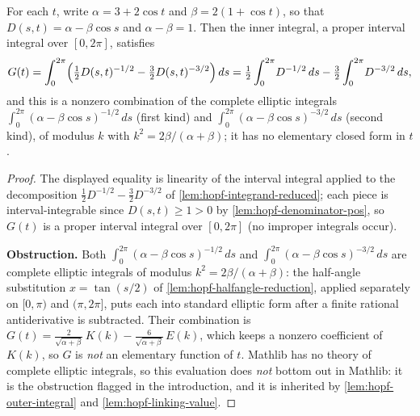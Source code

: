 \begin{lemma}
    \label{lem:hopf-inner-integral}
    For each $t$, write $\alpha=3+2\cos t$ and $\beta=2(1+\cos t)$, so that
    $D(s,t)=\alpha-\beta\cos s$ and $\alpha-\beta=1$. Then the inner integral, a
    proper interval integral over $[0,2\pi]$, satisfies
    \[
        G(t)=\int_0^{2\pi}\Bigl(\tfrac12 D(s,t)^{-1/2}-\tfrac32 D(s,t)^{-3/2}\Bigr)\,ds
            =\tfrac12\int_0^{2\pi}\!D^{-1/2}\,ds-\tfrac32\int_0^{2\pi}\!D^{-3/2}\,ds ,
    \]
    and this is a nonzero combination of the complete elliptic integrals
    $\int_0^{2\pi}(\alpha-\beta\cos s)^{-1/2}\,ds$ (first kind) and
    $\int_0^{2\pi}(\alpha-\beta\cos s)^{-3/2}\,ds$ (second kind), of modulus $k$ with
    $k^2=2\beta/(\alpha+\beta)$; it has no elementary closed form in $t$.
\end{lemma}
\begin{proof}
    The displayed equality is linearity of the interval integral applied to the
    decomposition $\tfrac12 D^{-1/2}-\tfrac32 D^{-3/2}$ of
    \cref{lem:hopf-integrand-reduced}; each piece is interval-integrable since
    $D(s,t)\ge1>0$ by \cref{lem:hopf-denominator-pos}, so $G(t)$ is a proper
    interval integral over $[0,2\pi]$ (no improper integrals occur).

    \textbf{Obstruction.} Both $\int_0^{2\pi}(\alpha-\beta\cos s)^{-1/2}\,ds$ and
    $\int_0^{2\pi}(\alpha-\beta\cos s)^{-3/2}\,ds$ are complete elliptic integrals of
    modulus $k^2=2\beta/(\alpha+\beta)$: the half-angle substitution $x=\tan(s/2)$
    of \cref{lem:hopf-halfangle-reduction}, applied separately on $[0,\pi)$ and
    $(\pi,2\pi]$, puts each into standard elliptic form after a finite rational
    antiderivative is subtracted. Their combination is
    $G(t)=\tfrac{2}{\sqrt{\alpha+\beta}}\,K(k)-\tfrac{6}{\sqrt{\alpha+\beta}}\,E(k)$,
    which keeps a nonzero coefficient of $K(k)$, so $G$ is \emph{not} an elementary
    function of $t$. Mathlib has no theory of complete elliptic integrals, so this
    evaluation does \emph{not} bottom out in Mathlib: it is the obstruction flagged
    in the introduction, and it is inherited by \cref{lem:hopf-outer-integral} and
    \cref{lem:hopf-linking-value}.
\end{proof}

